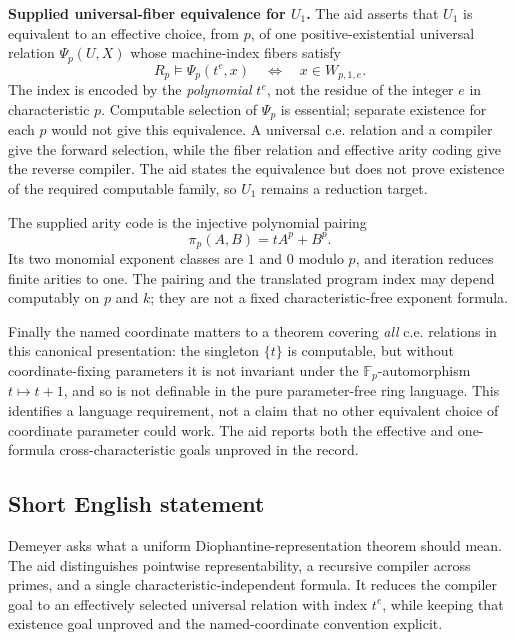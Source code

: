 \documentclass[11pt]{article}
\newcommand{\F}{\mathbb{F}}
\begin{document}
\textbf{Supplied universal-fiber equivalence for $U_1$.} The aid asserts that $U_1$ is equivalent to an effective choice, from $p$, of one positive-existential universal relation $\Psi_p(U,X)$ whose machine-index fibers satisfy
\[
 R_p\models\Psi_p(t^e,x)\quad\Longleftrightarrow\quad x\in W_{p,1,e}.
\]
The index is encoded by the \emph{polynomial} $t^e$, not the residue of the integer $e$ in characteristic $p$. Computable selection of $\Psi_p$ is essential; separate existence for each $p$ would not give this equivalence. A universal c.e. relation and a compiler give the forward selection, while the fiber relation and effective arity coding give the reverse compiler. The aid states the equivalence but does not prove existence of the required computable family, so $U_1$ remains a reduction target.

The supplied arity code is the injective polynomial pairing
\[
 \pi_p(A,B)=tA^p+B^p.
\]
Its two monomial exponent classes are $1$ and $0$ modulo $p$, and iteration reduces finite arities to one. The pairing and the translated program index may depend computably on $p$ and $k$; they are not a fixed characteristic-free exponent formula.

Finally the named coordinate matters to a theorem covering \emph{all} c.e. relations in this canonical presentation: the singleton $\{t\}$ is computable, but without coordinate-fixing parameters it is not invariant under the $\F_p$-automorphism $t\mapsto t+1$, and so is not definable in the pure parameter-free ring language. This identifies a language requirement, not a claim that no other equivalent choice of coordinate parameter could work. The aid reports both the effective and one-formula cross-characteristic goals unproved in the record.
\subsection{Short English statement}
Demeyer asks what a uniform Diophantine-representation theorem should mean. The aid distinguishes pointwise representability, a recursive compiler across primes, and a single characteristic-independent formula. It reduces the compiler goal to an effectively selected universal relation with index $t^e$, while keeping that existence goal unproved and the named-coordinate convention explicit.
\end{document}
